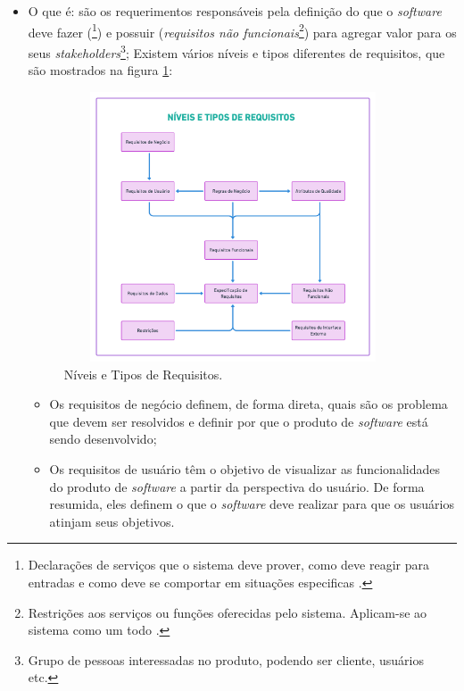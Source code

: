 \begin{itemize}
    \item O que é: são os requerimentos responsáveis pela definição do que o \textit{software} deve fazer (\footnote{Declarações de serviços que o sistema deve prover, como deve reagir para entradas e como deve se comportar em situações especificas \cite{sommerville2011}.}) e possuir (\textit{requisitos não funcionais}\footnote{Restrições aos serviços ou funções oferecidas pelo sistema. Aplicam-se ao sistema como um todo \cite{sommerville2011}.}) para agregar valor para os seus \textit{stakeholders}\footnote{Grupo de pessoas interessadas no produto, podendo ser cliente, usuários etc.}; Existem vários níveis e tipos diferentes de requisitos, que são mostrados na figura \ref{lev_tipo_req}:
    
    \begin{figure}[htb]
        \begin{center}
            \includegraphics[width=10cm, height=8cm, keepaspectratio]{figuras/lev_tipo_req.png}
            \caption{{Níveis e Tipos de Requisitos. \cite{westfall_5w2h}}}
            \label{lev_tipo_req}
        \end{center}
    \end{figure}
    
    \begin{itemize}
    
    \item Os requisitos de negócio definem, de forma direta, quais são os problema que devem ser resolvidos e definir por que o produto de \textit{software} está sendo desenvolvido;
    
    \item Os requisitos de usuário têm o objetivo de visualizar as funcionalidades do produto de \textit{software} a partir da perspectiva do usuário. De forma resumida, eles definem o que o \textit{software} deve realizar para que os usuários atinjam seus objetivos.
    

\end{itemize}
\end{itemize}
